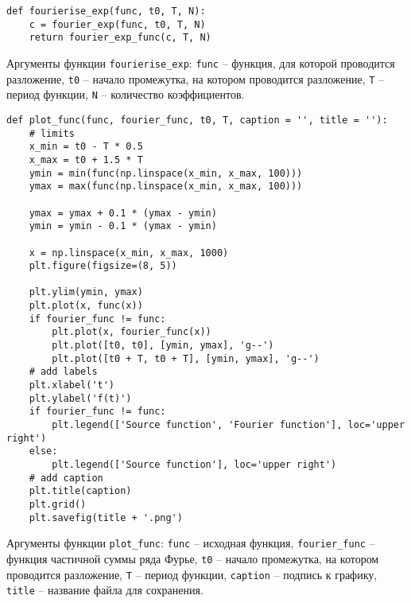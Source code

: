 \begin{lstlisting}[style=python_white, caption=Функция для получения разложения Фурье функции, label=lst:fourierise_exp]
def fourierise_exp(func, t0, T, N):
    c = fourier_exp(func, t0, T, N)
    return fourier_exp_func(c, T, N)
\end{lstlisting}
Аргументы функции \texttt{fourierise\_exp}: \texttt{func} -- функция, для которой проводится разложение, \texttt{t0} -- начало промежутка, на котором проводится разложение, \texttt{T} -- период функции, \texttt{N} -- количество коэффициентов.
\newline

\begin{lstlisting}[style=python_white, caption=Функция для отрисовки графиков, label=lst:plot_func]
def plot_func(func, fourier_func, t0, T, caption = '', title = ''):
    # limits
    x_min = t0 - T * 0.5
    x_max = t0 + 1.5 * T
    ymin = min(func(np.linspace(x_min, x_max, 100))) 
    ymax = max(func(np.linspace(x_min, x_max, 100))) 

    ymax = ymax + 0.1 * (ymax - ymin)
    ymin = ymin - 0.1 * (ymax - ymin)

    x = np.linspace(x_min, x_max, 1000)
    plt.figure(figsize=(8, 5)) 

    plt.ylim(ymin, ymax)
    plt.plot(x, func(x))
    if fourier_func != func:
        plt.plot(x, fourier_func(x))
        plt.plot([t0, t0], [ymin, ymax], 'g--')
        plt.plot([t0 + T, t0 + T], [ymin, ymax], 'g--')
    # add labels
    plt.xlabel('t')
    plt.ylabel('f(t)')
    if fourier_func != func:
        plt.legend(['Source function', 'Fourier function'], loc='upper right')
    else:
        plt.legend(['Source function'], loc='upper right')
    # add caption
    plt.title(caption)
    plt.grid()
    plt.savefig(title + '.png')
\end{lstlisting}
Аргументы функции \texttt{plot\_func}: \texttt{func} -- исходная функция, \texttt{fourier\_func} -- функция частичной суммы ряда Фурье, \texttt{t0} -- начало промежутка, на котором проводится разложение, \texttt{T} -- период функции, \texttt{caption} -- подпись к графику, \texttt{title} -- название файла для сохранения.
\newline

